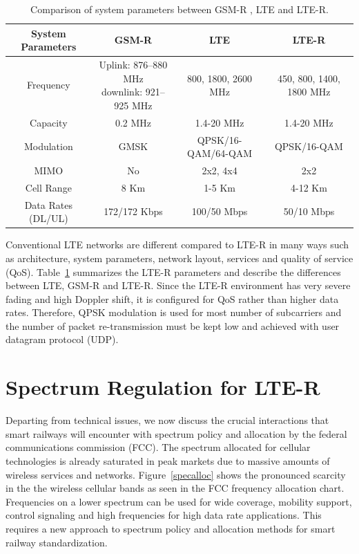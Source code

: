 \begin{table}[h!]
\caption{Comparison of system parameters between GSM-R , LTE and LTE-R.}
\begin{adjustbox}{width=1.22\textwidth, center=\textwidth}
\begin{tabular}{c | c | c | c}
\toprule
System Parameters & GSM-R & LTE & LTE-R\\ 
\midrule
Frequency & \shortstack{Uplink: 876--880 MHz\\downlink: 921--925 MHz} & 800, 1800, 2600 MHz & 450, 800, 1400, 1800 MHz \\  
Capacity  & 0.2 MHz & 1.4-20 MHz & 1.4-20 MHz\\ 
Modulation  & GMSK & QPSK/16-QAM/64-QAM & QPSK/16-QAM\\ 
MIMO  & No  & 2x2, 4x4  & 2x2\\ 
Cell Range  & 8 Km  & 1-5 Km & 4-12 Km \\ 
Data Rates (DL/UL)  & 172/172 Kbps  & 100/50 Mbps & 50/10 Mbps\\ 
\bottomrule
\end{tabular}
\end{adjustbox}
\label{ltertable}
\end{table}

Conventional LTE networks are different compared to LTE-R in many ways such as architecture, system parameters, network layout, services and quality of service (QoS). Table~\ref{ltertable} summarizes the LTE-R parameters and describe the differences between LTE, GSM-R and LTE-R. Since the LTE-R environment has very severe fading and high Doppler shift, it is configured for QoS rather than higher data rates. Therefore, QPSK modulation is used for most number of subcarriers and the number of packet re-transmission must be kept low and achieved with user datagram protocol (UDP).


\section{Spectrum Regulation for LTE-R}

Departing from technical issues, we now discuss the crucial interactions that smart railways will encounter with spectrum policy and allocation by the federal communications commission (FCC). The spectrum allocated for cellular technologies is already saturated in peak markets due to massive amounts of wireless services and networks. Figure~\ref{specalloc} shows the pronounced scarcity in the the wireless cellular bands as seen in the FCC frequency allocation chart. Frequencies on a lower spectrum can be used for wide coverage, mobility support, control signaling and high frequencies for high data rate applications. This requires a new approach to spectrum policy and allocation methods for smart railway standardization.

